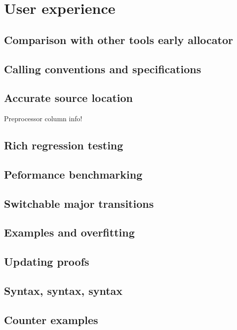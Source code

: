 \chapter{User experience}

\section{Comparison with other tools early allocator}

\section{Calling conventions and specifications}

\section{Accurate source location}

Preprocessor column info!

\section{Rich regression testing}

\section{Peformance benchmarking}

\section{Switchable major transitions}

\section{Examples and overfitting}

\section{Updating proofs}

\section{Syntax, syntax, syntax}

\section{Counter examples}\label{sec:counter-ex}

